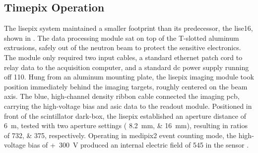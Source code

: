 \documentclass[../../../main.tex]{subfiles}
\begin{document}
%
    \subsection{Timepix Operation}%
    \label{sec:chapter-3:beamline-testing:timepix-operation}%
    The \gls{lisepix} system maintained a smaller footprint than its predecessor, the \gls{lise16}, shown in .
    The data processing module sat on top of the T-slotted aluminum extrusions, safely out of the neutron beam to protect the sensitive electronics.
    The module only required two input cables, a standard ethernet patch cord to relay data to the acquisition computer, and a standard \gls{dc} power supply running off \SI{110}{\voltac}.
    Hung from an aluminum mounting plate, the \gls{lisepix} imaging module took position immediately behind the imaging targets, roughly centered on the beam axis.
    The blue, high-channel density ribbon cable connected the imaging \gls{pcb}, carrying the \gls{high-voltage} bias and \gls{asic} data to the readout module.
    Positioned in front of the scintillator \gls{dark-box}, the \gls{lisepix} established an aperture distance of  \SI{6}{\meter}, tested with two aperture settings ( \SIlist[list-units=single]{8.2; 16}{\milli\meter}), resulting in  ratios of \numlist{732; 375}, respectively.
    Operating in \gls{medipix2} event counting mode, the \gls{high-voltage} bias of \SI{300}[+]{\volt} produced an internal electric field of \SI{545}{\electricfieldmm} in the sensor \cite{Herrera_2018}.
\end{document}
